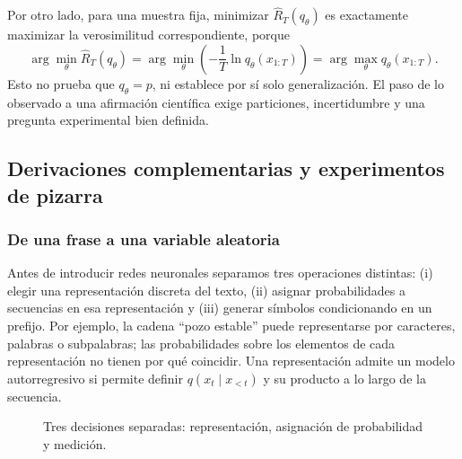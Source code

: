 Por otro lado, para una muestra fija, minimizar $\widehat R_T(q_\theta)$
es exactamente maximizar la verosimilitud correspondiente, porque
\[
\arg\min_\theta\widehat R_T(q_\theta)
=\arg\min_\theta\left(-\frac1T\ln q_\theta(x_{1:T})\right)
=\arg\max_\theta q_\theta(x_{1:T}).
\]
Esto no prueba que $q_\theta=p$, ni establece por sí solo generalización.
El paso de lo observado a una afirmación científica exige particiones,
incertidumbre y una pregunta experimental bien definida.




\subsection{Derivaciones complementarias y experimentos de pizarra}


\subsubsection*{De una frase a una variable aleatoria}

Antes de introducir redes neuronales separamos tres operaciones distintas:
(i) elegir una representación discreta del texto, (ii) asignar probabilidades a
secuencias en esa representación y (iii) generar símbolos condicionando en un
prefijo. Por ejemplo, la cadena ``pozo estable'' puede representarse por caracteres,
palabras o subpalabras; las probabilidades sobre los elementos de cada representación
no tienen por qué coincidir. Una representación admite un modelo autorregresivo
si permite definir $q(x_t\mid x_{<t})$ y su producto a lo largo de la secuencia.

\begin{figure}[H]\centering
{}
\caption{Tres decisiones separadas: representación, asignación de probabilidad y medición.}
\end{figure}

